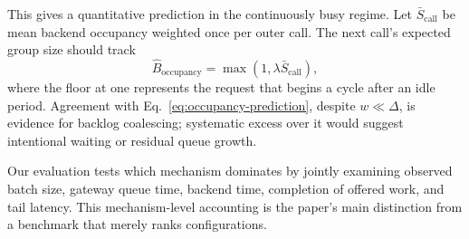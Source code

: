 This gives a quantitative prediction in the continuously busy regime. Let
$\bar S_{\mathrm{call}}$ be mean backend occupancy weighted once per outer
call. The next call's expected group size should track
\begin{equation}
  \widehat B_{\mathrm{occupancy}}
  = \max\!\left(1,\lambda \bar S_{\mathrm{call}}\right),
  \label{eq:occupancy-prediction}
\end{equation}
where the floor at one represents the request that begins a cycle after an idle
period. Agreement with Eq.~\ref{eq:occupancy-prediction}, despite
$w\ll\Delta$, is evidence for backlog coalescing; systematic excess over it
would suggest intentional waiting or residual queue growth.

Our evaluation tests which mechanism dominates by jointly examining observed
batch size, gateway queue time, backend time, completion of offered work, and
tail latency. This mechanism-level accounting is the paper's main distinction
from a benchmark that merely ranks configurations.
